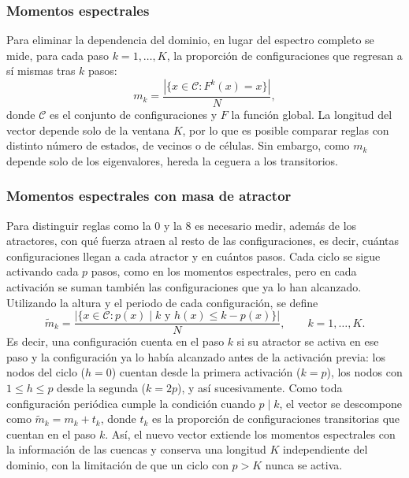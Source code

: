 \subsubsection{Momentos espectrales}

Para eliminar la dependencia del dominio, en lugar del espectro completo se mide, para cada paso $k = 1, \dots, K$, la proporción de configuraciones que regresan a sí mismas tras $k$ pasos:
\begin{equation}
	m_k = \frac{| \{ x \in \mathcal{C} : F^k(x) = x \} |}{N},
\end{equation}
donde $\mathcal{C}$ es el conjunto de configuraciones y $F$ la función global. La longitud del vector depende solo de la ventana $K$, por lo que es posible comparar reglas con distinto número de estados, de vecinos o de células. Sin embargo, como $m_k$ depende solo de los eigenvalores, hereda la ceguera a los transitorios.

\subsubsection{Momentos espectrales con masa de atractor} 

Para distinguir reglas como la 0 y la 8 es necesario medir, además de los atractores, con qué fuerza atraen al resto de las configuraciones, es decir, cuántas configuraciones llegan a cada atractor y en cuántos pasos. Cada ciclo se sigue activando cada $p$ pasos, como en los momentos espectrales, pero en cada activación se suman también las configuraciones que ya lo han alcanzado. Utilizando la altura y el periodo de cada configuración, se define
\begin{equation}
	\tilde{m}_k = \frac{| \{ x \in \mathcal{C} : p(x) \mid k \mbox{ y } h(x) \le k - p(x) \} |}{N}, \qquad k = 1, \dots, K.
\end{equation}
Es decir, una configuración cuenta en el paso $k$ si su atractor se activa en ese paso y la configuración ya lo había alcanzado antes de la activación previa: los nodos del ciclo ($h = 0$) cuentan desde la primera activación ($k = p$), los nodos con $1 \le h \le p$ desde la segunda ($k = 2p$), y así sucesivamente. Como toda configuración periódica cumple la condición cuando $p \mid k$, el vector se descompone como $\tilde{m}_k = m_k + t_k$, donde $t_k$ es la proporción de configuraciones transitorias que cuentan en el paso $k$. Así, el nuevo vector extiende los momentos espectrales con la información de las cuencas y conserva una longitud $K$ independiente del dominio, con la limitación de que un ciclo con $p > K$ nunca se activa.
	
